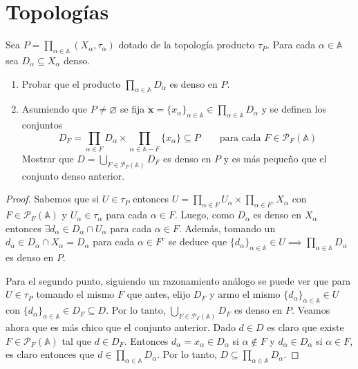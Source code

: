\documentclass{article}
\theoremstyle{plain}
\theoremstyle{definition}
\newcommand{\pf}{\mathcal{P}_F}                 %
\newenvironment{ejercicio}[1]{\begin{trivlist}
\item[\hskip \labelsep {\bfseries Ejercicio}\hskip \labelsep {\bfseries #1.}]}{\end{trivlist}}
\begin{document}
\clearpage

\section*{Topologías}

\begin{ejercicio}{1}
    Sea \( P = \prod_{\alpha \in \mathbb{A}} (X_\alpha, \tau_\alpha) \) dotado de la topología producto \( \tau_P \). Para cada \( \alpha \in \mathbb{A} \) sea \( D_\alpha \subseteq X_\alpha \) denso.
    \begin{enumerate}
        \item Probar que el producto \( \prod_{\alpha \in \mathbb{A}} D_\alpha \) es denso en \( P \).
        \item Asumiendo que \( P \neq \varnothing \) se fija \( \mathbf{x} = {\{x_\alpha \}}_{\alpha \in \mathbb{A}} \in \prod_{\alpha \in \mathbb{A}} D_\alpha \) y se definen los conjuntos
              \[
                  D_F = \prod_{\alpha \in F} D_\alpha \times \prod_{\alpha \in \mathbb{A} - F} \{x_\alpha \} \subseteq P \qquad \text{para cada } F \in \pf(\mathbb{A})
              \]
              Mostrar que \( D = \bigcup_{F \in \pf(\mathbb{A})} D_F \) es denso en \( P \) y es más pequeño que el conjunto denso anterior.
    \end{enumerate}
\end{ejercicio}
\begin{proof}
    Sabemos que si \( U \in \tau_P \) entonces \( U = \prod_{\alpha \in F} U_\alpha \times \prod_{\alpha \in F^c} X_\alpha \) con \( F \in \pf{(\mathbb{A})} \) y \( U_\alpha \in \tau_\alpha \) para cada \( \alpha \in F \).
    Luego, como \( D_\alpha \) es denso en \( X_\alpha \) entonces \( \exists d_\alpha \in D_\alpha \cap U_\alpha \) para cada \( \alpha \in F \). Además, tomando un \( d_\alpha \in D_\alpha \cap X_\alpha = D_\alpha \) para cada \( \alpha \in F^c \) se deduce que
    \( {\{ d_\alpha \}}_{\alpha \in \mathbb{A}} \in U \implies \prod_{\alpha \in \mathbb{A}} D_\alpha \) es denso en \( P \).

    Para el segundo punto, siguiendo un razonamiento análogo se puede ver que para \( U \in \tau_P \) tomando el mismo \( F \) que antes, elijo \( D_F \) y armo el mismo \( {\{ d_\alpha \}}_{\alpha \in \mathbb{A}} \in U \) con \( {\{ d_\alpha \}}_{\alpha \in \mathbb{A}} \in D_F \subseteq D \). Por lo tanto, \( \bigcup_{F \in \pf{(\mathbb{A})}} D_F \) es denso en \( P \).
    Veamos ahora que es más chico que el conjunto anterior. Dado \( d \in D \) es claro que existe \( F \in \pf{(\mathbb{A})} \) tal que \( d \in D_F \). Entonces \( d_\alpha = x_\alpha \in D_\alpha \) si \( \alpha \notin F \) y \( d_\alpha \in D_\alpha \) si \( \alpha \in F \), es claro entonces que \( d \in \prod_{\alpha \in \mathbb{A}} D_\alpha \).
    Por lo tanto, \( D \subseteq \prod_{\alpha \in \mathbb{A}} D_\alpha \).
\end{proof}
\end{document}
